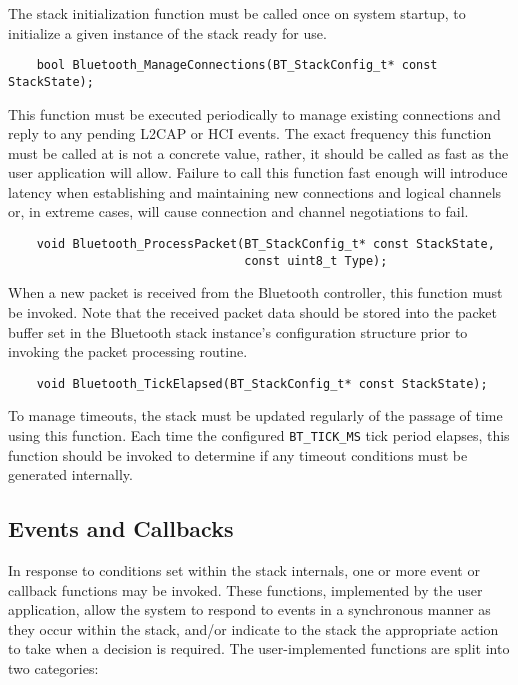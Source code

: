 The stack initialization function must be called once on system startup, to initialize a given instance of the stack ready for use.

\vspace{1em}
\begin{lstlisting}
	bool Bluetooth_ManageConnections(BT_StackConfig_t* const StackState);
\end{lstlisting}

This function must be executed periodically to manage existing connections and reply to any pending L2CAP or HCI events. The exact frequency this function must be called at is not a concrete value, rather, it should be called as fast as the user application will allow. Failure to call this function fast enough will introduce latency when establishing and maintaining new connections and logical channels or, in extreme cases, will cause connection and channel negotiations to fail.
	
\vspace{1em}
\begin{lstlisting}
	void Bluetooth_ProcessPacket(BT_StackConfig_t* const StackState,
	                             const uint8_t Type);
\end{lstlisting}

When a new packet is received from the Bluetooth controller, this function must be invoked. Note that the received packet data should be stored into the packet buffer set in the Bluetooth stack instance's configuration structure prior to invoking the packet processing routine.

\vspace{1em}
\begin{lstlisting}
	void Bluetooth_TickElapsed(BT_StackConfig_t* const StackState);
\end{lstlisting}

To manage timeouts, the stack must be updated regularly of the passage of time using this function. Each time the configured \lstinline{BT_TICK_MS} tick period elapses, this function should be invoked to determine if any timeout conditions must be generated internally.

\FloatBarrier
\subsection{Events and Callbacks}

In response to conditions set within the stack internals, one or more event or callback functions may be invoked. These functions, implemented by the user application, allow the system to respond to events in a synchronous manner as they occur within the stack, and/or indicate to the stack the appropriate action to take when a decision is required. The user-implemented functions are split into two categories:

